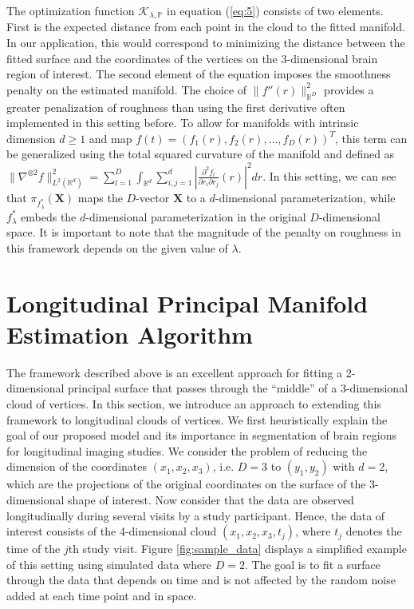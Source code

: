 \documentclass[11pt,reqno]{article}
\theoremstyle{definition}
\begin{document}
The optimization function $\mathcal{K}_{\lambda, \mathbb{P}}$ in equation (\ref{eq:5}) consists of two elements. First is the expected distance from each point in the cloud to the fitted manifold. In our application, this would correspond to minimizing the distance between the fitted surface and the coordinates of the vertices on the 3-dimensional brain region of interest. The second element of the equation imposes the smoothness penalty on the estimated manifold. The choice of $\|f''(r)\|_{\mathbb{R}^{D}}^2$ provides a greater penalization of roughness than using the first derivative often implemented in this setting before. To allow for manifolds with intrinsic dimension $d \geq 1$ and map $f(t) = \left(f_1(r), f_2(r), \dots, f_D(r)\right)^{T}$, this term can be generalized using the total squared curvature of the manifold and defined as $\|\nabla^{\otimes 2}f\|_{L^2(\mathbb{R}^{d})}^2 = \sum_{l=1}^{D} \int_{\mathbb{R}^{d}}\sum_{i, j = 1}^{d}\left|\frac{\partial^2f_l}{\partial r_i \partial r_j}(r)\right|^2dr$. In this setting, we can see that $\pi_{f_{\lambda}^{*}}(\boldsymbol{X})$ maps the $D$-vector $\boldsymbol{X}$ to a $d$-dimensional parameterization, while $f_{\lambda}^{*}$ embeds the $d$-dimensional parameterization in the original $D$-dimensional space. It is important to note that the  magnitude of the penalty on roughness in this framework depends on the given value of $\lambda$.








\section{Longitudinal Principal Manifold Estimation Algorithm}\label{s:LPME}

The framework described above is an excellent approach for fitting a 2-dimensional principal surface that passes through the ``middle'' of a 3-dimensional cloud of vertices. In this section, we introduce an approach to extending this framework to longitudinal clouds of vertices. We first heuristically explain the goal of our proposed model and its importance in segmentation of brain regions for longitudinal imaging studies. We consider the problem of reducing the dimension of the coordinates $(x_1, x_2, x_3)$, i.e. $D=3$ to $(y_1,y_2)$ with $d=2$, which are the projections of the original coordinates on the surface of the 3-dimensional shape of interest. Now consider that the data are observed longitudinally during several visits by a study participant. Hence, the data of interest consists of the 4-dimensional cloud $(x_1, x_2, x_3,t_j)$, where $t_j$ denotes the time of the $j$th study visit. Figure \ref{fig:sample_data} displays a simplified example of this setting using simulated data where $D = 2$. The goal is to fit a surface through the data that depends on time and is not affected by the random noise added at each time point and in space.
\end{document}
